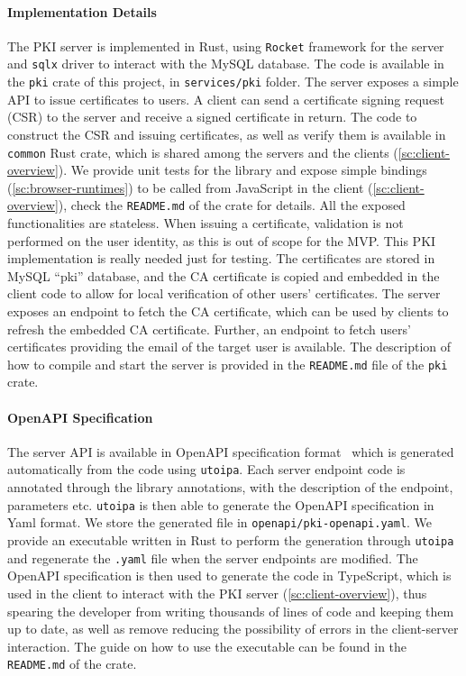 \paragraph{Implementation Details} 
The PKI server is implemented in Rust, using \texttt{Rocket}
framework for the server and \texttt{sqlx} driver to interact
with the MySQL database. The code is available in the \texttt{pki} crate
of this project, in \texttt{services/pki} folder.
The server exposes a simple API
to issue certificates to users. 
A client can send a certificate signing request (CSR)
to the server and receive a signed certificate in return.
The code to construct the CSR and issuing certificates, as well as 
verify them is available in \texttt{common} Rust crate,
which is shared among the servers and the clients (\cref{sc:client-overview}).
We provide unit tests for the library and expose simple bindings (\cref{sc:browser-runtimes}) to be
called from JavaScript in the client (\cref{sc:client-overview}), check the \texttt{README.md}
of the crate for details. All the exposed functionalities are stateless.
When issuing a certificate, validation is not performed
on the user identity, as this is out of scope for the MVP.
This PKI implementation is really needed just for testing.
The certificates are stored in MySQL ``pki'' database, and the CA
certificate is copied and embedded in the client code to allow
for local verification of other users' certificates.
The server exposes an endpoint to fetch the
CA certificate, which can be used by clients to
refresh the embedded CA certificate.
Further, an endpoint to fetch users' certificates providing the
email of the target user is available.
The description of how to compile and start the server is
provided in the \texttt{README.md} file of the \texttt{pki} crate.

\paragraph{OpenAPI Specification}
The server API is available in OpenAPI
specification format~\cite{OpenAPISurvey} 
which is generated automatically from the code using
\texttt{utoipa}. Each server endpoint code is
annotated through the library annotations, with the description
of the endpoint, parameters etc. \texttt{utoipa} is then
able to generate the OpenAPI specification in Yaml format.
We store the generated file in \texttt{openapi/pki-openapi.yaml}.
We provide an executable written in Rust to perform the generation
through \texttt{utoipa} and regenerate the \texttt{.yaml}
file when the server endpoints are modified.
The OpenAPI specification is then used to generate the
code in TypeScript, which is used in the client to interact
with the PKI server (\cref{sc:client-overview}), thus spearing
the developer from writing thousands of lines of code and keeping them up to date, 
as well as remove reducing the possibility of errors in the client-server interaction. 
The guide on how to use the executable can be found in the \texttt{README.md}
of the crate.

